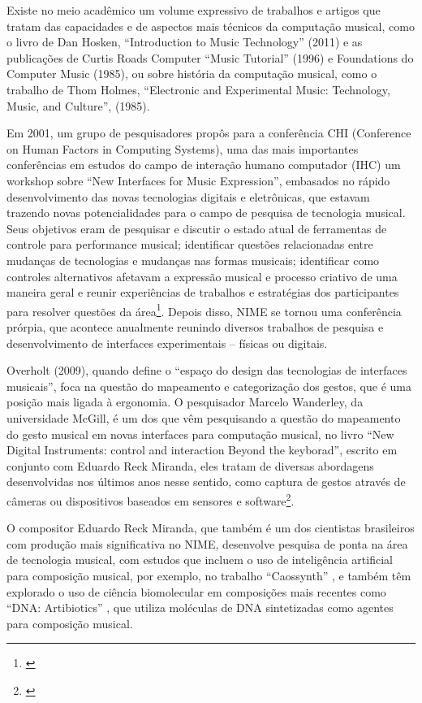 Existe no meio acadêmico um volume expressivo de trabalhos e artigos que tratam das capacidades e de aspectos mais técnicos da computação musical, como o livro de Dan Hosken, ``Introduction to Music Technology'' (2011) e as publicações de Curtis Roads Computer ``Music Tutorial'' (1996) e Foundations do Computer Music (1985), ou sobre história da computação musical, como o trabalho de Thom Holmes, ``Electronic and Experimental Music: Technology, Music, and Culture'', (1985). 

Em 2001, um grupo de pesquisadores propôs para a conferência CHI (Conference on Human Factors in Computing Systems), uma das mais importantes conferências em estudos do campo de interação humano computador (IHC) um workshop sobre ``New Interfaces for Music Expression'', embasados no rápido desenvolvimento das novas tecnologias digitais e eletrônicas, que estavam trazendo novas potencialidades para o campo de pesquisa de tecnologia musical. Seus objetivos eram de pesquisar e discutir o estado atual de ferramentas de controle para performance musical; identificar questões relacionadas entre mudanças de tecnologias e mudanças nas formas musicais; identificar como controles alternativos afetavam a expressão musical e processo criativo de uma maneira geral e reunir experiências de trabalhos e estratégias dos participantes para resolver questões da área\footnote{\cite{Poupyrev2001}}. Depois disso, NIME se tornou uma conferência prórpia, que acontece anualmente reunindo diversos trabalhos de pesquisa e desenvolvimento de interfaces experimentais – físicas ou digitais. 


Overholt (2009), quando define o ``espaço do design das tecnologias de interfaces musicais'', foca na questão do mapeamento e categorização dos gestos, que é uma posição mais ligada à ergonomia. O pesquisador Marcelo Wanderley, da universidade McGill, é um dos que vêm pesquisando a questão do mapeamento do gesto musical em novas interfaces para computação musical, no livro ``New Digital Instruments: control and interaction Beyond the keyborad'', escrito em conjunto com Eduardo Reck Miranda, eles tratam de diversas abordagens desenvolvidas nos últimos anos nesse sentido, como captura de gestos através de câmeras ou dispositivos baseados em sensores e software\footnote{\cite[67]{Miranda2006}}. 


O compositor Eduardo Reck Miranda, que também é um dos cientistas brasileiros com produção mais significativa no NIME, desenvolve pesquisa de ponta na área de tecnologia musical, com estudos que incluem o uso de inteligência artificial para composição musical, por exemplo, no trabalho ``Caossynth'' \citeyear{Miranda2016}, e também têm explorado o uso de ciência biomolecular em composições mais recentes como ``DNA: Artibiotics'' \citeyear{miranda2018artibiotics}, que utiliza moléculas de DNA sintetizadas como agentes para composição musical.



